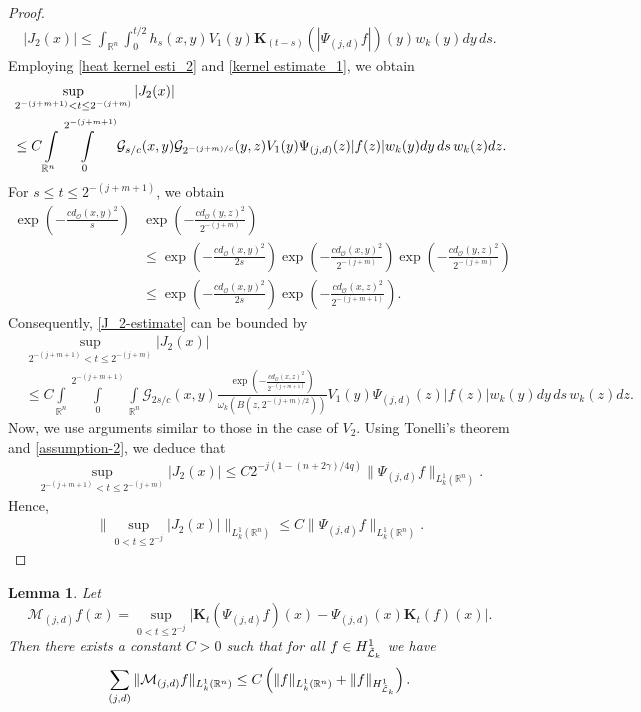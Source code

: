 \documentclass[11pt, reqno]{amsproc}
\newtheorem{lemma}[theorem]{Lemma}
\theoremstyle{definition}
\theoremstyle{remark}
\numberwithin{equation}{section}
\begin{document}
\begin{proof}
\begin{align*}
    |J_2(x)| \leq \int_{\mathbb{R}^n}\int_0^{t/2}  h_s(x,y)V_1(y)\mathbf{K}_{(t-s)}(|\Psi_{(j,d)}f|)(y)w_k(y)dy\,ds.
\end{align*} Employing \eqref{heat kernel esti_2} and \eqref{kernel estimate_1}, we obtain 
\begin{align}
   &  \sup \limits_{2^{-(j+m+1)} < t\leq 2^{-(j+m)}} |J_2(x)|\notag\\ 
   & \leq {C} \int\limits_{\mathbb{R}^n} \int\limits_{0}^{2^{-(j+m+1)}} \mathcal{G}_{s/c}(x,y)\mathcal{G}_{2^{-(j+m)/c}}(y,z) V_1(y)\Psi_{(j,d)}(z)|f(z)|w_k(y)dy\,ds\, w_k(z)dz. \label{J_2-estimate}
\end{align} For $s \leq t \leq 2^{-(j+m+1)}$, we obtain 
\begin{align*}
   \exp\left( -\frac{cd_\mathcal{O}(x,y)^2}{s} \right)&  \exp\left( -\frac{cd_\mathcal{O}(y,z)^2}{2^{-(j+m)}} \right) \\& \leq  \exp\left( -\frac{cd_\mathcal{O}(x,y)^2}{2s} \right) \exp\left( -\frac{cd_\mathcal{O}(x,y)^2}{2^{-(j+m)}} \right) \exp\left( -\frac{cd_\mathcal{O}(y,z)^2}{2^{-(j+m)}} \right)\\
   & \leq \exp\left( -\frac{cd_\mathcal{O}(x,y)^2}{2s} \right)  \exp \left(  -\frac{cd_\mathcal{O}(x,z)^2}{2^{-(j+m+1)}} \right).
\end{align*}
Consequently, \eqref{J_2-estimate} can be bounded by 
\begin{align*}
     &  \sup \limits_{2^{-(j+m+1)} < t\leq 2^{-(j+m)}} |J_2(x)|\\ 
     & \leq {C}\int\limits_{\mathbb{R}^n} \int\limits_0^{2^{-(j+m+1)}}  \int\limits_{\mathbb{R}^n}\mathcal{G}_{2s/c}(x,y) \frac{\exp\left( -\frac{cd_\mathcal{O}(x,z)^2}{2^{-(j+m+1)}} \right)}{\omega_k(B(z,2^{-(j+m)/2}))}V_1(y) \Psi_{(j,d)}(z)|f(z)|w_k(y)dy\,ds\,w_k(z)dz.
\end{align*} Now, we use arguments similar to those in the case of $V_2$. Using Tonelli's theorem and \eqref{assumption-2}, we deduce that
\begin{align*}
       \sup \limits_{2^{-(j+m+1)} < t\leq 2^{-(j+m)}} |J_2(x)|\leq C 2^{-j(1-(n+2\gamma)/4q)} \|\Psi_{(j,d)}f\|_{L_k^1(\mathbb{R}^n)}.
\end{align*} Hence, 
\begin{align*}
     \Bigg\| \sup_{0<t\leq 2^{-j}} |J_2(x)|  \Bigg\|_{L_k^1(\mathbb{R}^n)}  \leq C\|\Psi_{(j,d)}f\|_{L_k^1(\mathbb{R}^n)}.
\end{align*}
\end{proof}
 \begin{lemma}\label{Lemma B3}
     Let $$\mathcal{M}_{(j,d)}f(x)= \sup_{0<t\leq 2^{-j}}\Big| \mathbf{K}_t\left(\Psi_{(j,d)}f\right)(x)- \Psi_{(j,d)}(x)\mathbf{K}_t(f)(x)\Big|.$$
     Then there exists a constant $C>0$ such that for all $f\in H_{\Tilde{\mathcal{L}}_k}^1$ we have 
     \begin{align*}
\sum_{(j,d)}\|\mathcal{M}_{(j,d)}f\|_{L_k^1(\mathbb{R}^n)} \leq C \left(\|f\|_{L_k^1(\mathbb{R}^n)} +\|f\|_{H_{\Tilde{\mathcal{L}}_k}^1}\right) .
     \end{align*}  
 \end{lemma}
\end{document}
